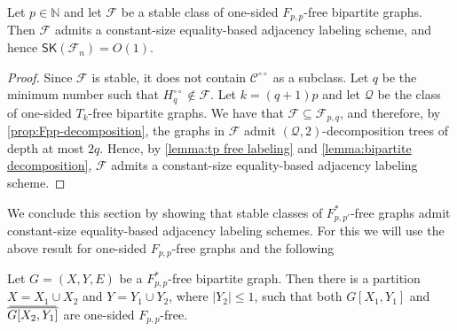 \documentclass{article}
\newcommand{\cC}{\ensuremath{\mathcal{C}}}
\newcommand{\cF}{\ensuremath{\mathcal{F}}}
\newcommand{\cQ}{\ensuremath{\mathcal{Q}}}
\newcommand\doverline[1]{%
  \setbox0=\hbox{$\!\overline{#1}\!$}%
  \ht0=\dimexpr\ht0-.2ex\relax%
  \,\overline{\copy0}\,%
}
\newcommand{\bc}[1]{\doverline{#1}} %
\newcommand{\RL}{\mathsf{SK}}
\newcommand{\dcirc}{{\circ\circ}}
\begin{document}
\begin{lemma}
\label{lemma:Fpq labeling scheme}
Let $p \in \mathbb{N}$ and let $\cF$ be a stable class of one-sided $F_{p,p}$-free bipartite graphs.
Then $\cF$ admits a constant-size equality-based adjacency labeling scheme, and hence $\RL(\cF_n) = O(1)$.
\end{lemma}
\begin{proof}
	Since $\cF$ is stable, it does not contain $\cC^\dcirc$ as a subclass.
	Let $q$ be the minimum number such that $H^{\circ\circ}_q \not\in \cF$.
	Let $k = (q+1)p$ and let $\cQ$ be the class of one-sided $T_k$-free bipartite graphs.
	We have that $\cF \subseteq \cF_{p,q}$, and therefore, by \cref{prop:Fpp-decomposition}, the graphs in $\cF$ admit $(\cQ,2)$-decomposition trees of depth at most $2q$.
	Hence, by \cref{lemma:tp free labeling} and \cref{lemma:bipartite decomposition},
	$\cF$ admits a constant-size equality-based adjacency labeling scheme.
\end{proof}

We conclude this section by showing that stable classes of $F^*_{p,p'}$-free graphs admit
constant-size equality-based adjacency labeling schemes. For this we will use the above result for
one-sided $F_{p,p}$-free graphs and the following

\begin{proposition}
\label{prop:allen F*}
Let $G = (X,Y,E)$ be a $F^*_{p,p}$-free bipartite graph. Then there is a partition $X = X_1 \cup
X_2$ and $Y = Y_1 \cup Y_2$, where $|Y_2| \leq 1$, such that both $G[X_1,Y_1]$ and $\bc{G[X_2,Y_1]}$ are one-sided $F_{p,p}$-free.
\end{proposition}
\end{document}
